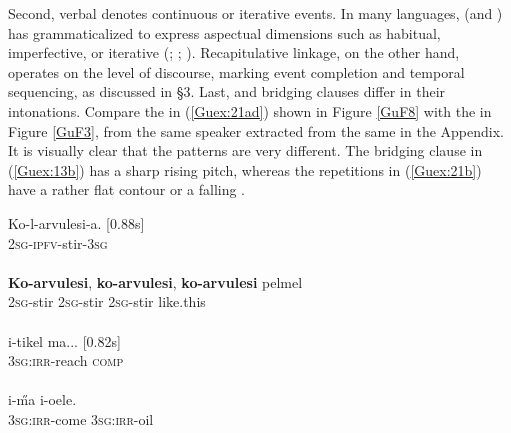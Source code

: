 \documentclass[output=paper]{LSP/langsci}
\begin{document}
Second, verbal  denotes continuous or iterative events. In many\linebreak {} languages,  (and ) has grammaticalized to express aspectual dimensions such as habitual, imperfective, or iterative (\citealt[][487]{besnier00}; \citealt[][117]{guerin11}; \citealt[][260]{dimock09}). Recapitulative linkage, on the other hand, operates on the level of discourse, marking event completion and temporal sequencing, as discussed in §3. Last,  and bridging clauses differ in their intonations.  Compare  the  in (\ref{Guex:21ad}) shown in Figure \ref{GuF8} with the  in Figure \ref{GuF3}, from the same speaker extracted from the same  in the Appendix. It is  visually clear that the patterns are very different. The bridging clause in (\ref{Guex:13b}) has a sharp rising pitch, whereas the repetitions in (\ref{Guex:21b}) have a rather flat contour or a falling .

\begin{exe}
\ex \label{Guex:21ad}
\begin{xlist}
\ex \label{Guex:21a}
\gll Ko-l-arvulesi-a. [0.88s]       \\
\textsc{2sg-ipfv-}stir-\textsc{3sg}      \\
\glt {}\\
\ex \label{Guex:21b}
\gll \textbf{Ko-arvulesi},   \textbf{ko-arvulesi}, \textbf{ko-arvulesi} pelmel    \\
 \textsc{2sg-}stir \textsc{2sg-}stir \textsc{2sg-}stir  like.this \\
\glt {}\\
\ex \label{Guex:21c}
\gll   i-tikel              ma...  [0.82s] \\
   \textsc{3sg}:\textsc{irr}-reach     \textsc{comp} \\
\glt {}\\
\ex \label{Guex:21d}
\gll   i-\H{m}a        i-oele.\\     	       
 \textsc{3sg}:\textsc{irr}-come     \textsc{3sg}:\textsc{irr}-oil\\
\glt {} 
\end{xlist}
\end{exe}
\end{document}
